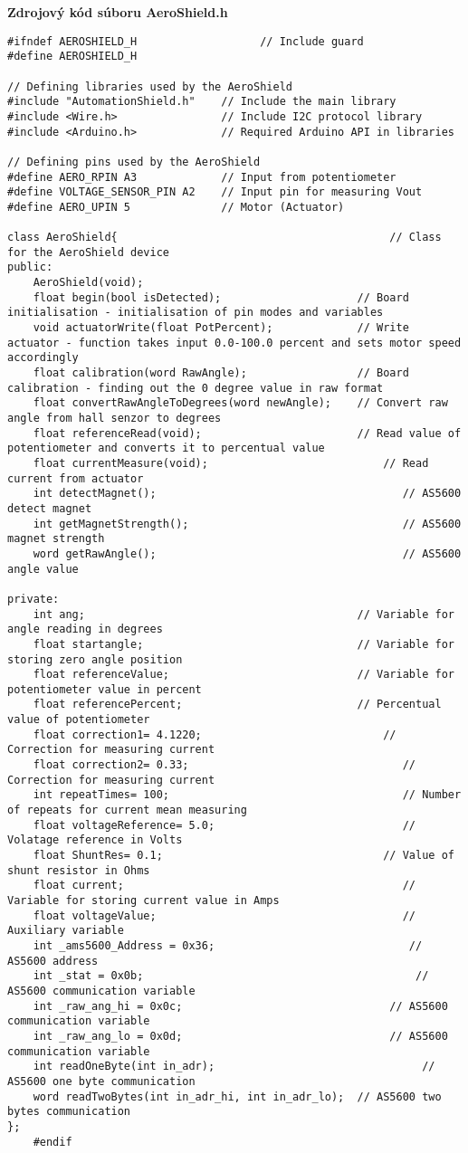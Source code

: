 \LARGE\bf{Zdrojový kód súboru AeroShield.h}
\vspace{1cm}
\begin{lstlisting}[caption={Zdrojový kód súboru AeroShield.h.},captionpos=b]	
#ifndef AEROSHIELD_H			       // Include guard
#define AEROSHIELD_H	
	
// Defining libraries used by the AeroShield 
#include "AutomationShield.h"    // Include the main library
#include <Wire.h>                // Include I2C protocol library
#include <Arduino.h>			 // Required Arduino API in libraries
	
// Defining pins used by the AeroShield 
#define AERO_RPIN A3             // Input from potentiometer
#define VOLTAGE_SENSOR_PIN A2    // Input pin for measuring Vout
#define AERO_UPIN 5              // Motor (Actuator)
	
class AeroShield{		    	                           // Class for the AeroShield device
public:
	AeroShield(void);
	float begin(bool isDetected);                     // Board initialisation - initialisation of pin modes and variables                             
	void actuatorWrite(float PotPercent);             // Write actuator - function takes input 0.0-100.0 percent and sets motor speed accordingly
	float calibration(word RawAngle);                 // Board calibration - finding out the 0 degree value in raw format 
	float convertRawAngleToDegrees(word newAngle);    // Convert raw angle from hall senzor to degrees
	float referenceRead(void);                        // Read value of potentiometer and converts it to percentual value 
	float currentMeasure(void);		  				      // Read current from actuator 
	int detectMagnet();								         // AS5600 detect magnet 
	int getMagnetStrength();						         // AS5600 magnet strength
	word getRawAngle();								         // AS5600 angle value 

private:
	int ang;                                          // Variable for angle reading in degrees 
	float startangle;                                 // Variable for storing zero angle position 
	float referenceValue;                             // Variable for potentiometer value in percent
	float referencePercent;                           // Percentual value of potentiometer 
	float correction1= 4.1220;						      // Correction for measuring current 
	float correction2= 0.33;						         // Correction for measuring current 
	int repeatTimes= 100;						  	         // Number of repeats for current mean measuring 
	float voltageReference= 5.0;					         // Volatage reference in Volts 
	float ShuntRes= 0.1;						   	      // Value of shunt resistor in Ohms 
	float current;						  			         // Variable for storing current value in Amps 
	float voltageValue;						  		         // Auxiliary variable
	int _ams5600_Address = 0x36;						      // AS5600 address
	int _stat = 0x0b;										   // AS5600 communication variable 
	int _raw_ang_hi = 0x0c;								   // AS5600 communication variable 
	int _raw_ang_lo = 0x0d;								   // AS5600 communication variable 
	int readOneByte(int in_adr);								// AS5600 one byte communication
	word readTwoBytes(int in_adr_hi, int in_adr_lo);  // AS5600 two bytes communication
};
	#endif
\end{lstlisting}